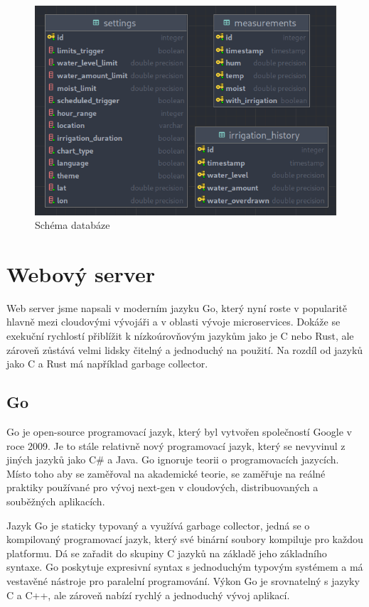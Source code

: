 \documentclass[12pt,a4paper]{article}
\begin{document}
\begin{figure}[h]
	\centering
	\includegraphics[width=0.9\linewidth]{db.png}
	\caption{Schéma databáze}
\end{figure}

\section{Webový server}

Web server jsme napsali v moderním jazyku Go, který nyní roste v popularitě
hlavně mezi cloudovými vývojáři a v oblasti vývoje microservices. Dokáže se
exekuční rychlostí přiblížit k nízkoúrovňovým jazykům jako je C nebo Rust, ale
zároveň zůstává velmi lidsky čitelný a jednoduchý na použití. Na rozdíl od
jazyků jako C a Rust má například garbage collector.

\subsection{Go}

Go je open-source programovací jazyk, který byl vytvořen společností Google v roce 2009. Je to stále relativně nový programovací jazyk, který se nevyvinul z jiných jazyků jako C\# a Java. Go ignoruje teorii o programovacích jazycích. Místo toho aby se zaměřoval na akademické teorie, se zaměřuje na reálné praktiky používané pro vývoj next-gen v cloudových, distribuovaných a souběžných aplikacích.

Jazyk Go je staticky typovaný a využívá garbage collector, jedná se o kompilovaný programovací jazyk, který své binární soubory kompiluje pro každou platformu. Dá se zařadit do skupiny C jazyků na základě jeho základního syntaxe. Go poskytuje expresivní syntax s jednoduchým typovým systémem a má vestavěné nástroje pro paralelní programování. Výkon Go je srovnatelný s jazyky C a C++, ale zároveň nabízí rychlý a jednoduchý vývoj aplikací.
\end{document}
